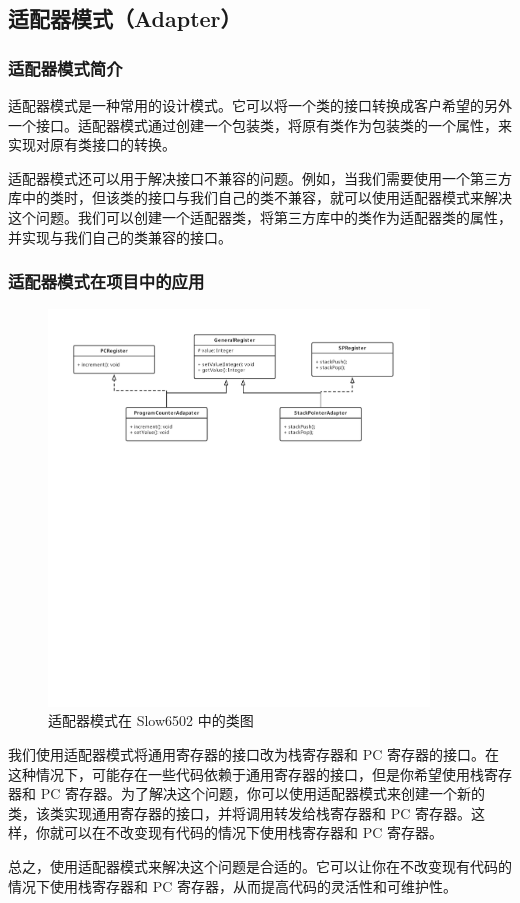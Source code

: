 \subsection{适配器模式（Adapter）}

\subsubsection{适配器模式简介}

适配器模式是一种常用的设计模式。它可以将一个类的接口转换成客户希望的另外一个接口。适配器模式通过创建一个包装类，将原有类作为包装类的一个属性，来实现对原有类接口的转换。

适配器模式还可以用于解决接口不兼容的问题。例如，当我们需要使用一个第三方库中的类时，但该类的接口与我们自己的类不兼容，就可以使用适配器模式来解决这个问题。我们可以创建一个适配器类，将第三方库中的类作为适配器类的属性，并实现与我们自己的类兼容的接口。

\subsubsection{适配器模式在项目中的应用}

\begin{figure}[h]
  \centering
  \includegraphics[width=0.9\textwidth]{figures/适配器模式.pdf}
  \caption{适配器模式在 Slow6502 中的类图}
\end{figure}

我们使用适配器模式将通用寄存器的接口改为栈寄存器和 PC 寄存器的接口。在这种情况下，可能存在一些代码依赖于通用寄存器的接口，但是你希望使用栈寄存器和 PC 寄存器。为了解决这个问题，你可以使用适配器模式来创建一个新的类，该类实现通用寄存器的接口，并将调用转发给栈寄存器和 PC 寄存器。这样，你就可以在不改变现有代码的情况下使用栈寄存器和 PC 寄存器。

总之，使用适配器模式来解决这个问题是合适的。它可以让你在不改变现有代码的情况下使用栈寄存器和 PC 寄存器，从而提高代码的灵活性和可维护性。

